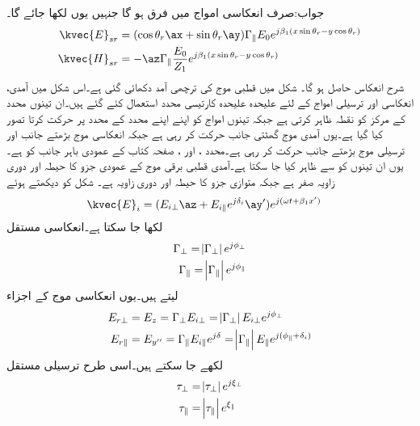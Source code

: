 جواب:صرف انعکاسی امواج میں فرق ہو گا جنہیں یوں لکھا جائے گا۔
\begin{align*}
\kvec{E}_{sr}&= (\cos \theta_r \ax+\sin \theta_r \ay)\Gamma_{\parallel} E_0 e^{ j \beta_1 (x \sin \theta_r-y\cos \theta_r)}\\
\kvec{H}_{sr}&=-\az\Gamma_{\parallel} \frac{ E_0}{Z_1} e^{j \beta_1 (x \sin \theta_r-y\cos \theta_r)}
\end{align*}
شرح انعکاس  حاصل ہو گا۔
شکل  میں قطبی موج کی ترچھی آمد دکھائی گئی ہے۔اس شکل میں آمدی، انعکاسی اور ترسیلی امواج کے لئے علیحدہ علیحدہ کارتیسی محدد استعمال کئے گئے ہیں۔ان تینوں محدد کے مرکز کو نقطہ  ظاہر کرتی ہے جبکہ تینوں امواج کو اپنے اپنے محدد کے  محدد پر حرکت کرتا تصور کیا گیا ہے۔یوں آمدی موج گھٹتی  جانب حرکت کر رہی ہے جبکہ انعکاسی موج  بڑھتے  جانب اور ترسیلی موج بڑھتے  جانب حرکت کر رہی ہے۔محدد ،  اور ،  صفحہ کتاب کے عمودی باہر جانب کو ہے۔یوں ان تینوں کو  سے ظاہر کیا جا سکتا ہے۔آمدی قطبی برقی موج کے عمودی جزو کا حیطہ  اور دوری زاویہ صفر ہے جبکہ متوازی جزو کا حیطہ  اور دوری زاویہ   ہے۔ شکل کو دیکھتے ہوئے 
\begin{align}\label{مساوات_ترچھی_بیضوی__قطبی}
\kvec{E}_i&=(E_{i\perp} \az+E_{i\parallel} e^{j\delta_i}\ay')e^{j(\omega t+\beta_1 x')}
\end{align}
لکھا جا سکتا ہے۔انعکاسی مستقل
\begin{align}
\Gamma_{\perp}=\abs{\Gamma_{\perp}} e^{j\phi_{\perp}}\\
\Gamma_{\parallel}=\abs{\Gamma_{\parallel}} e^{j\phi_{\parallel}}
\end{align}
لیتے ہیں۔یوں انعکاسی موج کے  اجزاء 
\begin{align}
E_{r\perp}&=E_z=\Gamma_{\perp} E_{i\perp}=\abs{\Gamma_{\perp}}E_{i\perp} e^{j\phi_{\perp}}\\
E_{r\parallel}&=E_{y''}=\Gamma_{\parallel} E_{i\parallel}e^{j\delta}=\abs{\Gamma_{\parallel}} E_{\parallel} e^{j(\phi_{\parallel}+\delta_i)}
\end{align}
 لکھے جا سکتے ہیں۔اسی طرح  ترسیلی مستقل
\begin{align}
\tau_{\perp}&=\abs{\tau_{\perp}}e^{j\xi_{\perp}}\\
\tau_{\parallel}&=\abs{\tau_{\parallel}}e^{\xi_{\parallel}}
\end{align}
